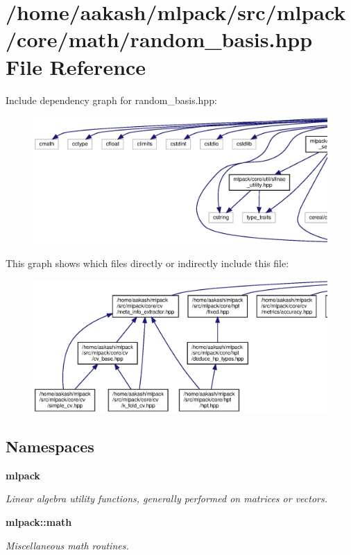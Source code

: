 \section{/home/aakash/mlpack/src/mlpack/core/math/random\+\_\+basis.hpp File Reference}
\label{random__basis_8hpp}
Include dependency graph for random\+\_\+basis.\+hpp\+:
\nopagebreak
\begin{figure}[H]
\begin{center}
\leavevmode
\includegraphics[width=350pt]{random__basis_8hpp__incl}
\end{center}
\end{figure}
This graph shows which files directly or indirectly include this file\+:
\nopagebreak
\begin{figure}[H]
\begin{center}
\leavevmode
\includegraphics[width=350pt]{random__basis_8hpp__dep__incl}
\end{center}
\end{figure}
\subsection*{Namespaces}
\begin{DoxyCompactItemize}
\item 
 \textbf{ mlpack}
\begin{DoxyCompactList}\small\item\em Linear algebra utility functions, generally performed on matrices or vectors. \end{DoxyCompactList}\item 
 \textbf{ mlpack\+::math}
\begin{DoxyCompactList}\small\item\em Miscellaneous math routines. \end{DoxyCompactList}\end{DoxyCompactItemize}
